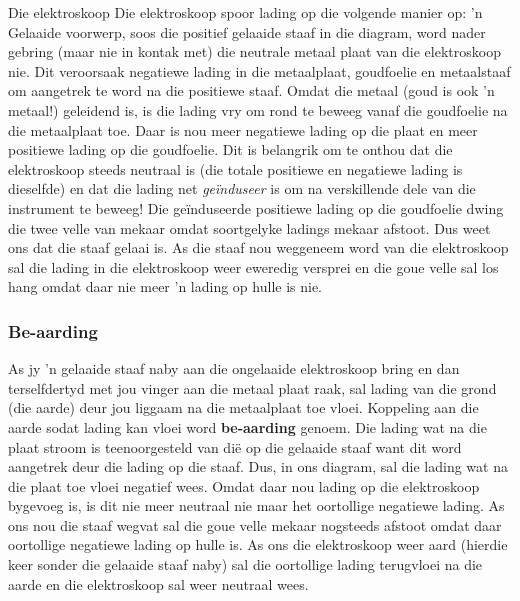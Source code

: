 \begin{Investigation}{Die elektroskoop}
Die elektroskoop spoor lading op die volgende manier op: 'n Gelaaide voor\-werp, soos die positief gelaaide staaf in die diagram, word nader gebring (maar nie in kontak met) die neutrale metaal plaat van die elektroskoop nie. Dit veroorsaak negatiewe lading in die metaalplaat, goudfoelie en metaalstaaf om aangetrek te word na die positiewe staaf. Omdat die metaal (goud is ook 'n metaal!) geleidend is, is die lading vry om rond te beweeg vanaf die goudfoelie na die metaalplaat toe. Daar is nou meer negatiewe lading op die plaat en meer positiewe lading op die goudfoelie. Dit is belangrik om te onthou dat die elektroskoop steeds neutraal is (die totale positiewe en negatiewe lading is dieselfde) en dat die lading net \textsl{ge\"induseer} is om na verskillende dele van die instrument te beweeg! Die ge\"induseerde positiewe lading op die goudfoelie dwing die twee velle van mekaar omdat soortgelyke ladings mekaar afstoot. Dus weet ons dat die staaf gelaai is. As die staaf nou weggeneem word van die elektroskoop sal die lading in die elektroskoop weer eweredig versprei en die goue velle sal los hang omdat daar nie meer 'n lading op hulle is nie. \par




\subsubsection{Be-aarding}
\nopagebreak

As jy 'n gelaaide staaf naby aan die ongelaaide elektroskoop bring en dan terselfdertyd met jou vinger aan die metaal plaat raak, sal lading van die grond (die aarde) deur jou liggaam na die metaalplaat toe vloei. Koppeling aan die aarde sodat lading kan vloei word \textbf{be-aarding} genoem. Die lading wat na die plaat stroom is teenoorgesteld van di\"e op die gelaaide staaf want dit word aangetrek deur die lading op die staaf. Dus, in ons diagram, sal die lading wat na die plaat toe vloei negatief wees. Omdat daar nou lading op die elektroskoop bygevoeg is, is dit nie meer neutraal nie maar het oortollige negatiewe lading. As ons nou die staaf wegvat sal die goue velle mekaar nogsteeds afstoot omdat daar oortollige negatiewe lading op hulle is. As ons die elektroskoop weer aard (hierdie keer sonder die gelaaide staaf naby) sal die oortollige lading terugvloei na die aarde en die elektroskoop sal weer neutraal wees. \par


\end{Investigation}
